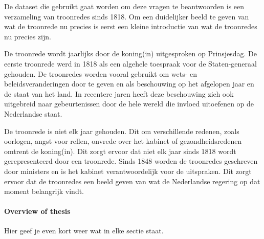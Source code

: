 De dataset die gebruikt gaat worden om deze vragen te beantwoorden is een verzameling van troonredes sinds 1818. Om een duidelijker beeld te geven van wat de troonrede nu precies is eerst een kleine introductie van wat de troonredes nu precies zijn.

De troonrede wordt jaarlijks door de koning(in) uitgesproken op Prinsjesdag. De eerste troonrede werd in 1818 als een algehele toespraak voor de Staten-generaal gehouden. De troonredes worden vooral gebruikt om wets- en beleidsveranderingen door te geven en als beschouwing op het afgelopen jaar en de staat van het land. In recentere jaren heeft deze beschouwing zich ook uitgebreid naar gebeurtenissen door de hele wereld die invloed uitoefenen op de Nederlandse staat.

De troonrede is niet elk jaar gehouden. Dit om verschillende redenen, zoals oorlogen, angst voor rellen, onvrede over het kabinet of gezondheidsredenen omtrent de koning(in). Dit zorgt ervoor dat niet elk jaar sinds 1818 wordt gerepresenteerd door een troonrede. Sinds 1848 worden de troonredes geschreven door ministers en is het kabinet verantwoordelijk voor de uitspraken. Dit zorgt ervoor dat de troonredes een beeld geven van wat de Nederlandse regering op dat moment belangrijk vindt.


\paragraph{Overview of thesis}
Hier geef je even kort weer wat in elke sectie staat.